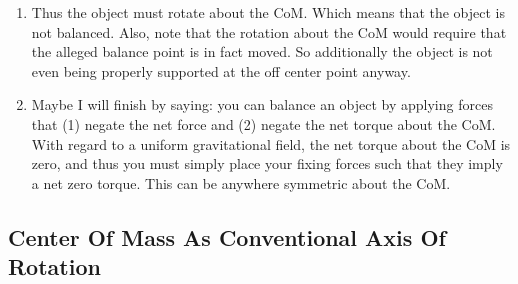 \begin{enumerate}
  \item Thus the object must rotate about the CoM. Which means that the
  object is not balanced. Also, note that the rotation about the CoM
  would require that the alleged balance point is in fact moved. So
  additionally the object is not even being properly supported at the
  off center point anyway.

  \item Maybe I will finish by saying: you can balance an object by
  applying forces that (1) negate the net force and (2) negate the net
  torque about the CoM. With regard to a uniform gravitational field,
  the net torque about the CoM is zero, and thus you must simply place
  your fixing forces such that they imply a net zero torque. This can be
  anywhere symmetric about the CoM.
\end{enumerate}

\subsection{Center Of Mass As Conventional Axis Of Rotation}

